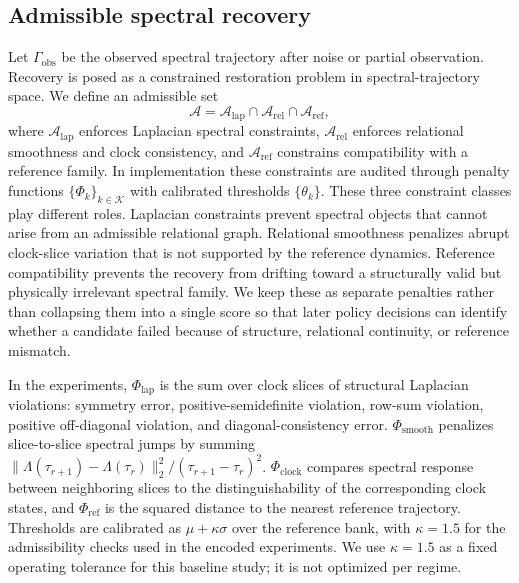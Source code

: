 \documentclass{iopjournal}
\begin{document}
\subsection{Admissible spectral recovery}\label{subsec:admissible-recovery}

Let $\Gamma_{\mathrm{obs}}$ be the observed spectral trajectory after noise or
partial observation. Recovery is posed as a constrained restoration problem in
spectral-trajectory space. We define an admissible set
\begin{equation}
\mathcal{A}
=
\mathcal{A}_{\mathrm{lap}}
\cap
\mathcal{A}_{\mathrm{rel}}
\cap
\mathcal{A}_{\mathrm{ref}},
\end{equation}
where $\mathcal{A}_{\mathrm{lap}}$ enforces Laplacian spectral constraints,
$\mathcal{A}_{\mathrm{rel}}$ enforces relational smoothness and clock consistency,
and $\mathcal{A}_{\mathrm{ref}}$ constrains compatibility with a reference family.
In implementation these constraints are audited through penalty functions
$\{\Phi_k\}_{k\in\mathcal{K}}$ with calibrated thresholds $\{\theta_k\}$.
These three constraint classes play different roles. Laplacian constraints prevent
spectral objects that cannot arise from an admissible relational graph. Relational
smoothness penalizes abrupt clock-slice variation that is not supported by the
reference dynamics. Reference compatibility prevents the recovery from drifting
toward a structurally valid but physically irrelevant spectral family. We keep
these as separate penalties rather than collapsing them into a single score so
that later policy decisions can identify whether a candidate failed because of
structure, relational continuity, or reference mismatch.

In the experiments, $\Phi_{\mathrm{lap}}$ is the sum over clock slices of
structural Laplacian violations: symmetry error, positive-semidefinite violation,
row-sum violation, positive off-diagonal violation, and diagonal-consistency
error. $\Phi_{\mathrm{smooth}}$ penalizes slice-to-slice spectral jumps by summing
$\|\Lambda(\tau_{r+1})-\Lambda(\tau_r)\|_2^2/(\tau_{r+1}-\tau_r)^2$.
$\Phi_{\mathrm{clock}}$ compares spectral response between neighboring slices to
the distinguishability of the corresponding clock states, and
$\Phi_{\mathrm{ref}}$ is the squared distance to the nearest reference trajectory.
Thresholds are calibrated as $\mu+\kappa\sigma$ over the reference bank, with
$\kappa=1.5$ for the admissibility checks used in the encoded experiments.
We use $\kappa=1.5$ as a fixed operating tolerance for this baseline study; it is
not optimized per regime.
\end{document}
